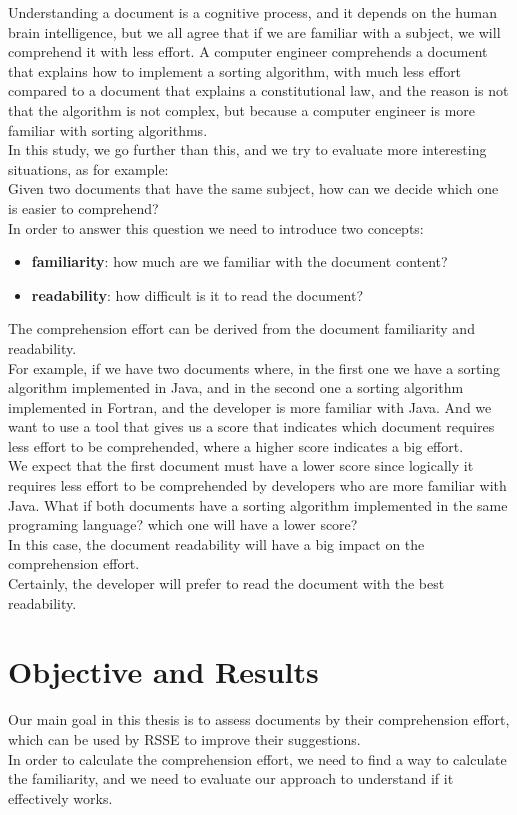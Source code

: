\documentclass[12pt,mscthesis]{usiinfthesis}
\begin{document}
	Understanding a document is a cognitive process, and it depends on the human brain intelligence, but we all agree that if we are familiar with a subject, we will comprehend it with less effort. A computer engineer comprehends a document that explains how to implement a sorting algorithm, with much less effort compared to a document that explains a constitutional law, and the reason is not that the algorithm is not complex, but because a computer engineer is more familiar with sorting algorithms.\\
	
	In this study, we go further than this, and we try to evaluate more interesting situations, as for example:\\
	Given two documents that have the same subject, how can we decide which one is easier to comprehend?\\
	In order to answer this question we need to introduce two concepts:
	\begin{itemize}
	\item \textbf{familiarity}: how much are we familiar with the document content?
	\item \textbf{readability}: how difficult is it to read the document?
	\end{itemize}
	The comprehension effort can be derived from the document familiarity and readability.\\

	For example, if we have two documents where, in the first one we have a sorting algorithm implemented in Java, and in the second one a sorting algorithm implemented in Fortran, and the developer is more familiar with Java. And we want to use a tool that gives us a score that indicates which document requires less effort to be comprehended, where a higher score indicates a big effort.\\
	We expect that the first document must have a lower score since logically it requires less effort to be comprehended by developers who are more familiar with Java.
	What if both documents have a sorting algorithm implemented in the same programing language? which one will have a lower score? \\
	In this case, the document readability will have a big impact on the comprehension effort.\\
	Certainly, the developer will prefer to read the document with the best readability.\\
	
	\section{Objective and Results}
	Our main goal in this thesis is to assess documents by their comprehension effort, which can be used by RSSE to improve their suggestions.\\
	In order to calculate the comprehension effort, we need to find a way to calculate the familiarity, and we need to evaluate our approach to understand if it effectively works.\\
\end{document}

